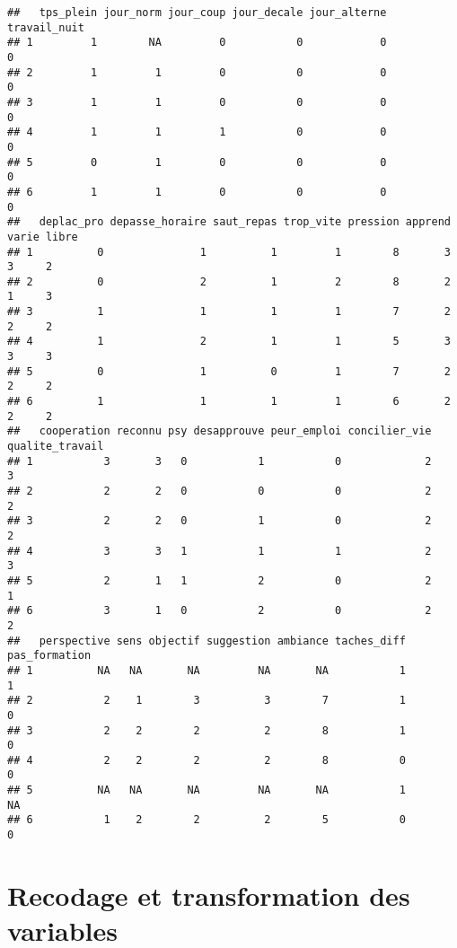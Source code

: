 \documentclass[
]{article}
\begin{document}
\begin{verbatim}
##   tps_plein jour_norm jour_coup jour_decale jour_alterne travail_nuit
## 1         1        NA         0           0            0            0
## 2         1         1         0           0            0            0
## 3         1         1         0           0            0            0
## 4         1         1         1           0            0            0
## 5         0         1         0           0            0            0
## 6         1         1         0           0            0            0
##   deplac_pro depasse_horaire saut_repas trop_vite pression apprend varie libre
## 1          0               1          1         1        8       3     3     2
## 2          0               2          1         2        8       2     1     3
## 3          1               1          1         1        7       2     2     2
## 4          1               2          1         1        5       3     3     3
## 5          0               1          0         1        7       2     2     2
## 6          1               1          1         1        6       2     2     2
##   cooperation reconnu psy desapprouve peur_emploi concilier_vie qualite_travail
## 1           3       3   0           1           0             2               3
## 2           2       2   0           0           0             2               2
## 3           2       2   0           1           0             2               2
## 4           3       3   1           1           1             2               3
## 5           2       1   1           2           0             2               1
## 6           3       1   0           2           0             2               2
##   perspective sens objectif suggestion ambiance taches_diff pas_formation
## 1          NA   NA       NA         NA       NA           1             1
## 2           2    1        3          3        7           1             0
## 3           2    2        2          2        8           1             0
## 4           2    2        2          2        8           0             0
## 5          NA   NA       NA         NA       NA           1            NA
## 6           1    2        2          2        5           0             0
\end{verbatim}

\section{Recodage et transformation des
variables}\label{recodage-et-transformation-des-variables}
\end{document}
